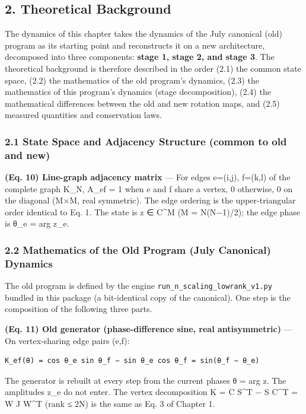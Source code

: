 \documentclass[
  a4paper,
]{ltjsarticle}
\begin{document}
\subsection{2. Theoretical Background}\label{theoretical-background}

The dynamics of this chapter takes the dynamics of the July canonical
(old) program as its starting point and reconstructs it on a new
architecture, decomposed into three components: \textbf{stage 1, stage
2, and stage 3}. The theoretical background is therefore described in
the order (2.1) the common state space, (2.2) the mathematics of the old
program's dynamics, (2.3) the mathematics of this program's dynamics
(stage decomposition), (2.4) the mathematical differences between the
old and new rotation maps, and (2.5) measured quantities and
conservation laws.

\subsubsection{2.1 State Space and Adjacency Structure (common to old
and
new)}\label{state-space-and-adjacency-structure-common-to-old-and-new}

\textbf{(Eq. 10) Line-graph adjacency matrix} --- For edges e=(i,j),
f=(k,l) of the complete graph K\_N, A\_ef = 1 when e and f share a
vertex, 0 otherwise, 0 on the diagonal (M×M, real symmetric). The edge
ordering is the upper-triangular order identical to Eq. 1. The state is
z ∈ C\^{}M (M = N(N−1)/2); the edge phase is θ\_e = arg z\_e.

\subsubsection{2.2 Mathematics of the Old Program (July Canonical)
Dynamics}\label{mathematics-of-the-old-program-july-canonical-dynamics}

The old program is defined by the engine
\texttt{run\_n\_scaling\_lowrank\_v1.py} bundled in this package (a
bit-identical copy of the canonical). One step is the composition of the
following three parts.

\textbf{(Eq. 11) Old generator (phase-difference sine, real
antisymmetric)} --- On vertex-sharing edge pairs (e,f):

\begin{verbatim}
K_ef(θ) = cos θ_e sin θ_f − sin θ_e cos θ_f = sin(θ_f − θ_e)
\end{verbatim}

The generator is rebuilt at every step from the current phases θ = arg
z. The amplitudes \textbar z\_e\textbar{} do not enter. The vertex
decomposition K = C S\^{}T − S C\^{}T = W J W\^{}T (rank ≤ 2N) is the
same as Eq. 3 of Chapter 1.
\end{document}
